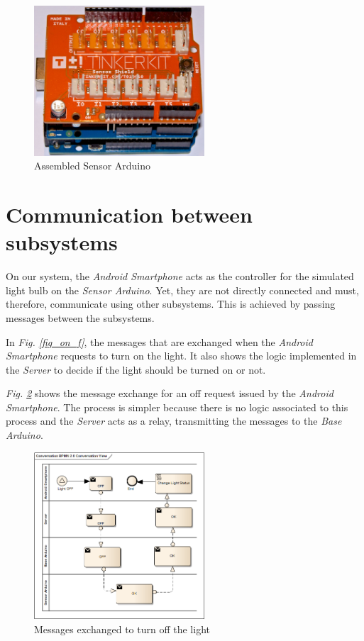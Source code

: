 \documentclass[conference, a4paper]{IEEEtran}
\begin{document}
\begin{figure}[H]
\centering
\includegraphics[width=2.5in]{Sensor_Arduino}
\caption{Assembled Sensor Arduino}
\label{fig_s_ard}
\end{figure}

\section{Communication between subsystems}
\label{comm_sub}

On our system, the \textit{Android Smartphone} acts as the controller for the simulated light bulb on the \textit{Sensor Arduino}. Yet, they are not directly connected and must, therefore, communicate using other subsystems. This is achieved by passing messages between the subsystems.

In \textit{Fig. \ref{fig_on_f}}, the messages that are exchanged when the \textit{Android Smartphone} requests to turn on the light. It also shows the logic implemented in the \textit{Server} to decide if the light should be turned on or not.

\textit{Fig. \ref{fig_off_f}} shows the message exchange for an off request issued by the \textit{Android Smartphone}. The process is simpler because there is no logic associated to this process and the \textit{Server} acts as a relay, transmitting the messages to the \textit{Base Arduino}.

\begin{figure}[H]
\centering
\includegraphics[width=2.5in]{OFF_Flow}
\caption{Messages exchanged to turn off the light}
\label{fig_off_f}
\end{figure}
\end{document}
